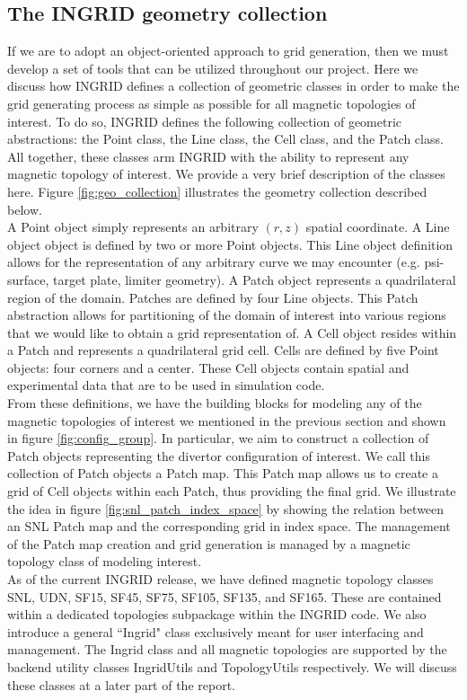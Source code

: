 \subsection{\label{sec:label2}The INGRID geometry collection}
If we are to adopt an object-oriented approach to grid generation, then we must develop a set of tools that can be utilized throughout our project. Here we discuss how INGRID defines a collection of geometric classes in order to make the grid generating process as simple as possible for all magnetic topologies of interest. To do so, INGRID defines the following collection of geometric abstractions: the Point class, the Line class, the Cell class, and the Patch class. All together, these classes arm INGRID with the ability to represent any magnetic topology of interest. We provide a very brief description of the classes here. Figure \ref{fig:geo_collection} illustrates the geometry collection described below.\\
\indent
A Point object simply represents an arbitrary $(r,z)$ spatial coordinate. A Line object object is defined by two or more Point objects. This Line object definition allows for the representation of any arbitrary curve we may encounter (e.g. psi-surface, target plate, limiter geometry). A Patch object represents a quadrilateral region of the domain. Patches are defined by four Line objects. This Patch abstraction allows for partitioning of the domain of interest into various regions that we would like to obtain a grid representation of. A Cell object resides within a Patch and represents a quadrilateral grid cell. Cells are defined by five Point objects: four corners and a center. These Cell objects contain spatial and experimental data that are to be used in simulation code.\\ \indent
From these definitions, we have the building blocks for modeling any of the magnetic topologies of interest we mentioned in the previous section and shown in figure \ref{fig:config_group}. In particular, we aim to construct a collection of Patch objects representing the divertor configuration of interest. We call this collection of Patch objects a Patch map. This Patch map allows us to create a grid of Cell objects within each Patch, thus providing the final grid. We illustrate the idea in figure \ref{fig:snl_patch_index_space} by showing the relation between an SNL Patch map and the corresponding grid in index space. The management of the Patch map creation and grid generation is managed by a magnetic topology class of modeling interest. \\ \indent
As of the current INGRID release, we have defined magnetic topology classes SNL, UDN, SF15, SF45, SF75, SF105, SF135, and SF165. These are contained within a dedicated topologies subpackage within the INGRID code. We also introduce a general ``Ingrid" class exclusively meant for user interfacing and management. The Ingrid class and all magnetic topologies are supported by the backend utility classes IngridUtils and TopologyUtils respectively. We will discuss these classes at a later part of the report.
